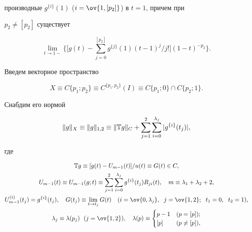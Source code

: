 производные $g^{\{i\}}(1)$ ($i=\ov{1,[p_2]}$) в $t=1$, причем при 


$p_2\ne[p_2]$ существует 


$$ 


\lim_{t\to 1-}\bigg\{\bigg[g(t)-\sum^{[p_2]}_{j=0} 


g^{\{j\}}(1)(t-1)^j/j!\bigg](1-t)^{-p_2}\bigg\}. 


$$ 


 


Введем векторное пространство 


$$ 


X\equiv C\{p_1;p_2\}\equiv C^{\{p_1,p_2\}}(I) 


\equiv C\{p_1;0\}\cap C\{p_2;1\}. 


$$ 


Снабдим его нормой 


\begin{equation} 


\|g\|_X\equiv\|g\|_{1,2}\equiv\|\Bbb T g\|_C+\sum^2_{j=1} 


\sum^{\lambda_j}_{i=0}|g^{\{i\}}(t_j)|, 


\end{equation} 


где 


\begin{gather} 


\Bbb T g\equiv[g(t)-U_{m-1}(t)]/u(t)\equiv G(t)\in C,\\ 


% 


U_{m-1}(t)\equiv U_{m-1}(g;t)\equiv\sum^2_{j=1} 


\sum^{\lambda_j}_{i=0}g^{\{i\}}(t_j)R_{j i}(t), 


\quad m\equiv\lambda_1+\lambda_2+2,\notag \\ 


% 


U^{(i)}_{m-1}(t_j)=g^{\{i\}}(t_j),\quad G(t_j)\equiv 


\lim_{t\to t_j}G(t)\quad (i=\ov{0,\lambda_j}, 


\ \; j=\ov{1,2};\ \; t_1=0,\ \; t_2=1),\notag \\ 


%


\lambda_j\equiv\lambda(p_j)\ \; (j=\ov{1,2}),\quad \lambda(p)\equiv 


\begin{cases} 


p-1 & (p=[p]);\\ 


\lbrack p \rbrack  & (p\ne[p]), 


\end{cases} 


\notag


\end{gather} 


